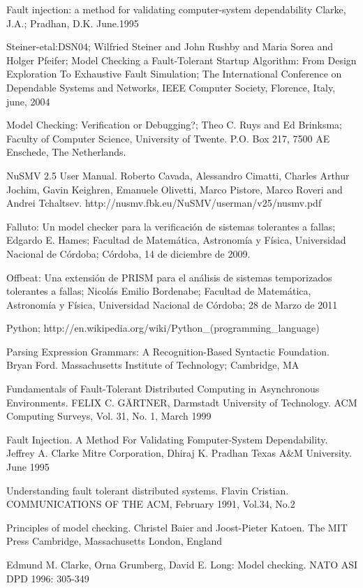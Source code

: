 \documentclass[titlepage, 12pt]{book}
\begin{document}
\begin{thebibliography}{99}

 Fault injection: a method for validating computer-system dependability
Clarke, J.A.; Pradhan, D.K. June.1995 

 Steiner-etal:DSN04; Wilfried Steiner and John Rushby and Maria Sorea and Holger Pfeifer; Model Checking a Fault-Tolerant Startup Algorithm: From Design Exploration To Exhaustive Fault Simulation; The International Conference on Dependable Systems and Networks, IEEE Computer Society, Florence, Italy, june, 2004

 Model Checking: Verification or Debugging?; Theo C. Ruys and Ed Brinksma; Faculty of Computer Science, University of Twente. P.O. Box 217, 7500 AE Enschede, The Netherlands.

 NuSMV 2.5 User Manual. Roberto Cavada, Alessandro Cimatti, Charles Arthur Jochim, Gavin Keighren,
Emanuele Olivetti, Marco Pistore, Marco Roveri and Andrei Tchaltsev. http://nusmv.fbk.eu/NuSMV/userman/v25/nusmv.pdf

 Falluto: Un model checker para la verificaci\'on de sistemas tolerantes a fallas; Edgardo E. Hames; Facultad de Matem\'atica, Astronom\'ia y F\'isica, Universidad Nacional de C\'ordoba; C\'ordoba, 14 de diciembre de 2009.

 Offbeat: Una extensi\'on de PRISM para el an\'alisis de sistemas temporizados tolerantes a fallas; Nicol\'as Emilio Bordenabe; Facultad de Matem\'atica, Astronom\'ia y F\'isica, Universidad Nacional de C\'ordoba; 28 de Marzo de 2011

 Python; http://en.wikipedia.org/wiki/Python\_(programming\_language)

 Parsing Expression Grammars: A Recognition-Based Syntactic Foundation. Bryan Ford. Massachusetts Institute of Technology; Cambridge, MA

 Fundamentals of Fault-Tolerant Distributed Computing in Asynchronous Environments. FELIX C. GÄRTNER,
Darmstadt University of Technology. ACM Computing Surveys, Vol. 31, No. 1, March 1999

 Fault Injection. A Method For Validating Fomputer-System Dependability. Jeffrey A. Clarke Mitre Corporation, Dhiraj K. Pradhan Texas A\&M University. June 1995

 Understanding fault tolerant distributed systems. Flavin Cristian. COMMUNICATIONS OF THE ACM, February 1991, Vol.34, No.2

 Principles of model checking. Christel Baier and Joost-Pieter Katoen. The MIT Press Cambridge, Massachusetts
London, England

 Edmund M. Clarke, Orna Grumberg, David E. Long: Model checking. NATO ASI DPD 1996: 305-349


\end{thebibliography}

\end{document}

